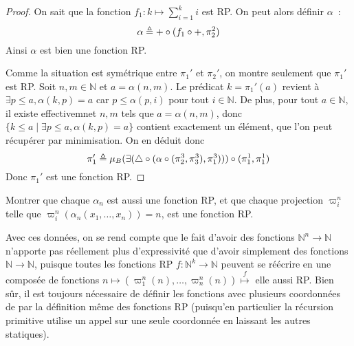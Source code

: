 \begin{proof}
  On sait que la fonction $f_1 : k \mapsto \sum_{i = 1}^k i$ est RP. On peut
  alors définir $\alpha$~:
  \[\alpha \triangleq + \circ (f_1\circ +,\pi_2^2)\]
  Ainsi $\alpha$ est bien une fonction RP.

  Comme la situation est symétrique entre $\pi_1'$ et $\pi_2'$, on montre
  seulement que $\pi_1'$ est RP. Soit $n,m\in \mathbb N$ et $a = \alpha(n,m)$.
  Le prédicat $k = \pi_1'(a)$ revient à $\exists p \leq a,\alpha(k,p) = a$ car
  $p \leq \alpha(p,i)$ pour tout $i\in\mathbb N$. De plus, pour tout
  $a\in \mathbb N$, il existe effectivemnet $n,m$ tels que $a = \alpha(n,m)$,
  donc $\{k \leq a \mid \exists p\leq a, \alpha(k,p) = a\}$
  contient exactement un élément, que l'on peut récupérer par minimisation.
  On en déduit donc
  \[\pi_1' \triangleq \mu_B (\exists(\triangle\circ
  (\alpha\circ (\pi_2^3,\pi_3^3), \pi_1^3)))\circ (\pi_1^1,\pi_1^1)\]
  Donc $\pi_1'$ est une fonction RP.
\end{proof}

\begin{exercise}
  Montrer que chaque $\alpha_n$ est aussi une fonction RP, et que chaque
  projection $\varpi_i^n$ telle que $\varpi_i^n(\alpha_n(x_1,\ldots,x_n)) = n$,
  est une fonction RP.
\end{exercise}

Avec ces données, on se rend compte que le fait d'avoir des fonctions
$\mathbb N^n \to \mathbb N$ n'apporte pas réellement plus d'expressivité que
d'avoir simplement des fonctions $\mathbb N \to \mathbb N$, puisque toutes les
fonctions RP $f : \mathbb N^k \to \mathbb N$ peuvent se réécrire en une
composée de fonctions
$n \mapsto (\varpi_1^n(n),\ldots,\varpi_n^n(n)) \overset{f}{\mapsto}$ elle aussi
RP. Bien sûr, il est toujours nécessaire de définir les fonctions avec plusieurs
coordonnées de par la définition même des fonctions RP (puisqu'en particulier
la récursion primitive utilise un appel sur une seule coordonnée en laissant les
autres statiques).
